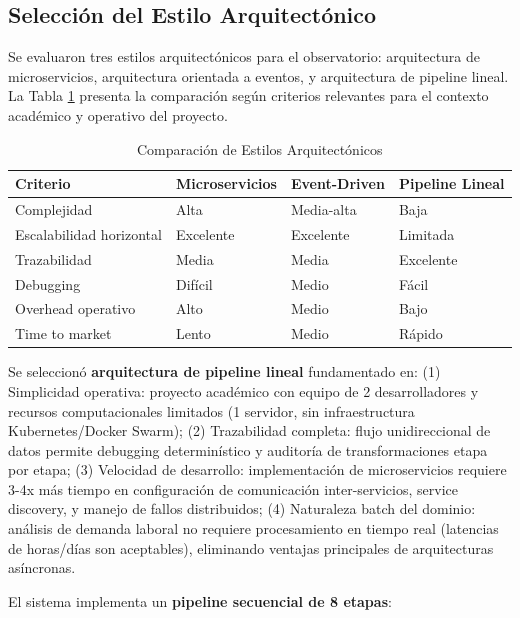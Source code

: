 \subsection{Selección del Estilo Arquitectónico}

Se evaluaron tres estilos arquitectónicos para el observatorio: arquitectura de microservicios, arquitectura orientada a eventos, y arquitectura de pipeline lineal. La Tabla \ref{tab:arch-comparison} presenta la comparación según criterios relevantes para el contexto académico y operativo del proyecto.

\begin{table}[H]
\centering
\caption{Comparación de Estilos Arquitectónicos}
\label{tab:arch-comparison}
\begin{tabular}{|p{3cm}|p{3.5cm}|p{3.5cm}|p{3.5cm}|}
\hline
\textbf{Criterio} & \textbf{Microservicios} & \textbf{Event-Driven} & \textbf{Pipeline Lineal} \\
\hline
Complejidad & Alta & Media-alta & Baja \\
\hline
Escalabilidad horizontal & Excelente & Excelente & Limitada \\
\hline
Trazabilidad & Media & Media & Excelente \\
\hline
Debugging & Difícil & Medio & Fácil \\
\hline
Overhead operativo & Alto & Medio & Bajo \\
\hline
Time to market & Lento & Medio & Rápido \\
\hline
\end{tabular}
\end{table}

Se seleccionó \textbf{arquitectura de pipeline lineal} fundamentado en: (1) Simplicidad operativa: proyecto académico con equipo de 2 desarrolladores y recursos computacionales limitados (1 servidor, sin infraestructura Kubernetes/Docker Swarm); (2) Trazabilidad completa: flujo unidireccional de datos permite debugging determinístico y auditoría de transformaciones etapa por etapa; (3) Velocidad de desarrollo: implementación de microservicios requiere 3-4x más tiempo en configuración de comunicación inter-servicios, service discovery, y manejo de fallos distribuidos; (4) Naturaleza batch del dominio: análisis de demanda laboral no requiere procesamiento en tiempo real (latencias de horas/días son aceptables), eliminando ventajas principales de arquitecturas asíncronas.

El sistema implementa un \textbf{pipeline secuencial de 8 etapas}:

